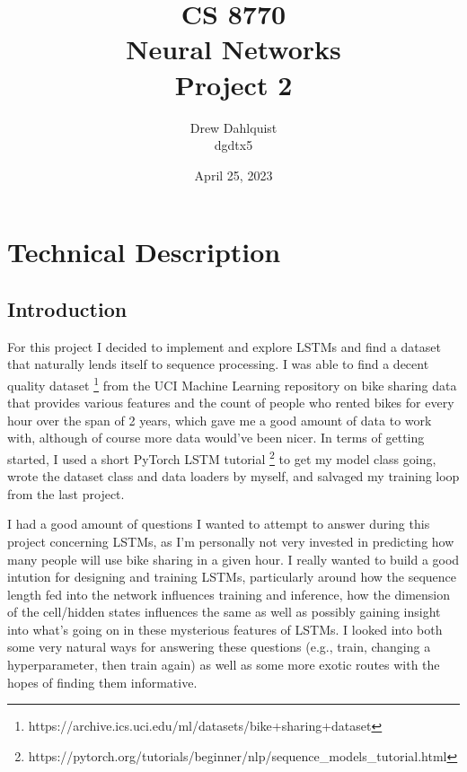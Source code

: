 \documentclass[12pt, twoside]{report}
\begin{document}
\title{CS 8770 \\ Neural Networks \\ Project 2}
\author{Drew Dahlquist \\ dgdtx5}
\date{April 25, 2023}
\maketitle

\tableofcontents



\chapter{Technical Description}

\section{Introduction}

For this project I decided to implement and explore LSTMs and find a dataset that naturally lends itself to 
sequence processing. I was able to find a decent quality dataset
\footnote[1]{https://archive.ics.uci.edu/ml/datasets/bike+sharing+dataset}
from the UCI Machine Learning repository on
bike sharing data that provides various features and the count of people who rented bikes for every hour over the 
span of 2 years, which gave me a good amount of data to work with, although of course more data would've been nicer.
In terms of getting started, I used a short PyTorch LSTM tutorial
\footnote[2]{https://pytorch.org/tutorials/beginner/nlp/sequence\_models\_tutorial.html}
to get my model class going, wrote the dataset class and data loaders by myself, and
salvaged my training loop from the last project.

I had a good amount of questions I wanted to attempt to answer during this project concerning LSTMs, as I'm
personally not very invested in predicting how many people will use bike sharing in a given hour.
I really wanted to build a good intution for designing and training LSTMs, particularly around how the
sequence length fed into the network influences training and inference, how the dimension of the cell/hidden states
influences the same as well as possibly gaining insight into what's going on in these mysterious features of LSTMs.
I looked into both some very natural ways for answering these questions 
(e.g., train, changing a hyperparameter, then train again) as well as some more exotic routes with the hopes
of finding them informative.
\end{document}
